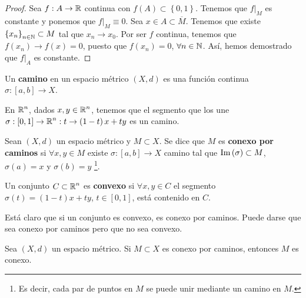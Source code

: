 \begin{proof}
	Sea $\displaystyle f:A \to \mathbb{R} $ continua con $\displaystyle f\left(A\right) \subset \left\{ 0,1\right\}  $. Tenemos que $\displaystyle f|_{M} $ es constante y ponemos que $\displaystyle f|_{M}\equiv 0 $. Sea $\displaystyle x \in A \subset \overline{M} $. Tenemos que existe $\displaystyle \left\{ x_{n}\right\} _{n\in\mathbb{N}}\subset M $ tal que $\displaystyle x_{n} \to x_{0} $.
Por ser $\displaystyle f $ continua, tenemos que $\displaystyle f\left(x_{n}\right)\to f\left(x\right) = 0 $, puesto que $\displaystyle f\left(x_{n}\right) = 0 $, $\displaystyle \forall n \in \mathbb{N} $. Así, hemos demostrado que $\displaystyle f|_{A} $ es constante.
\end{proof}
\begin{definition}[Camino]
	Un \textbf{camino} en un espacio métrico $\displaystyle \left(X,d\right) $ es una función continua $\displaystyle \sigma : [a,b] \to X $. 
\end{definition}
\begin{eg}
	En $\displaystyle \mathbb{R}^{n} $, dados $\displaystyle x,y \in \mathbb{R}^{n} $, tenemos que el segmento que los une $\displaystyle \sigma : [0,1] \to \mathbb{R}^{n} : t \to \left(1-t\right)x +ty $ es un camino. 
\end{eg}
\begin{definition}
	Sean $\displaystyle \left(X,d\right) $ un espacio métrico y $\displaystyle M \subset X $. Se dice que $\displaystyle M $ es \textbf{conexo por caminos} si $\displaystyle \forall x,y \in M $ existe $\displaystyle \sigma : [a,b] \to X $ camino tal que $\displaystyle \operatorname{Im}\left(\sigma \right) \subset M $, $\displaystyle \sigma\left(a\right) = x $ y $\displaystyle \sigma\left(b\right) = y $ \footnote{Es decir, cada par de puntos en $\displaystyle M $ se puede unir mediante un camino en $\displaystyle M $.}.
\end{definition}
\begin{definition}[Convexidad]
	Un conjunto $\displaystyle C \subset \mathbb{R}^{n} $ es \textbf{convexo} si $\displaystyle \forall x,y \in C $ el segmento $\displaystyle \sigma\left(t\right) = \left(1-t\right)x + ty $, $\displaystyle t \in [0,1] $, está contenido en $\displaystyle C $.
\end{definition}
\begin{observation}
Está claro que si un conjunto es convexo, es conexo por caminos. Puede darse que sea conexo por caminos pero que no sea convexo.
\end{observation}
\begin{theorem}
Sea $\displaystyle \left(X,d\right) $ un espacio métrico. Si $\displaystyle M \subset X $ es conexo por caminos, entonces $\displaystyle M $ es conexo.
\end{theorem}
